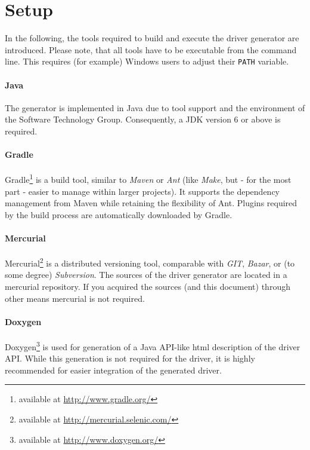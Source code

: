 \documentclass{report}
\begin{document}
\section{Setup}
\label{sec:setup}
In the following, the tools required to build and execute the driver generator are introduced. Please note, that all tools have to be executable from the command line. This requires (for example) Windows users to adjust their \texttt{PATH} variable.

\paragraph{Java}
The generator is implemented in Java due to tool support and the environment of the Software Technology Group. Consequently, a JDK version 6 or above is required. %

\paragraph{Gradle}
Gradle\footnote{available at \url{http://www.gradle.org/}} is a build tool, similar to \textit{Maven} or \textit{Ant} (like \textit{Make}, but - for the most part - easier to manage within larger projects). It supports the dependency management from Maven while retaining the flexibility of Ant. Plugins required by the build process are automatically downloaded by Gradle.

\paragraph{Mercurial}
Mercurial\footnote{available at \url{http://mercurial.selenic.com/}} is a distributed versioning tool, comparable with \textit{GIT}, \textit{Bazar}, or (to some degree) \textit{Subversion}. The sources of the driver generator are located in a mercurial repository. If you acquired the sources (and this document) through other means mercurial is not required.

\paragraph{Doxygen}
Doxygen\footnote{available at \url{http://www.doxygen.org/}} is used for generation of a Java API-like html description of the driver API. While this generation is not required for the driver, it is highly recommended for easier integration of the generated driver.
\end{document}
